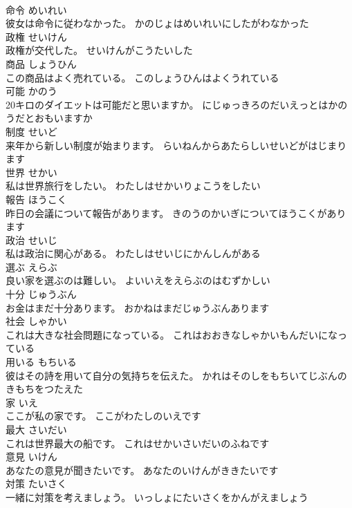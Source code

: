 \documentclass[8pt]{extreport}
\begin{document}
\begin{CJK}{UTF8}{min}
\\	命令	めいれい	
\\	彼女は命令に従わなかった。	かのじょはめいれいにしたがわなかった	
\\	政権	せいけん	
\\	政権が交代した。	せいけんがこうたいした	
\\	商品	しょうひん	
\\	この商品はよく売れている。	このしょうひんはよくうれている	
\\	可能	かのう	
\\	20キロのダイエットは可能だと思いますか。	にじゅっきろのだいえっとはかのうだとおもいますか	
\\	制度	せいど	
\\	来年から新しい制度が始まります。	らいねんからあたらしいせいどがはじまります	
\\	世界	せかい	
\\	私は世界旅行をしたい。	わたしはせかいりょこうをしたい	
\\	報告	ほうこく	
\\	昨日の会議について報告があります。	きのうのかいぎについてほうこくがあります	
\\	政治	せいじ	
\\	私は政治に関心がある。	わたしはせいじにかんしんがある	
\\	選ぶ	えらぶ	
\\	良い家を選ぶのは難しい。	よいいえをえらぶのはむずかしい	
\\	十分	じゅうぶん	
\\	お金はまだ十分あります。	おかねはまだじゅうぶんあります	
\\	社会	しゃかい	
\\	これは大きな社会問題になっている。	これはおおきなしゃかいもんだいになっている	
\\	用いる	もちいる	
\\	彼はその詩を用いて自分の気持ちを伝えた。	かれはそのしをもちいてじぶんのきもちをつたえた	
\\	家	いえ	
\\	ここが私の家です。	ここがわたしのいえです	
\\	最大	さいだい	
\\	これは世界最大の船です。	これはせかいさいだいのふねです	
\\	意見	いけん	
\\	あなたの意見が聞きたいです。	あなたのいけんがききたいです	
\\	対策	たいさく	
\\	一緒に対策を考えましょう。	いっしょにたいさくをかんがえましょう	

\end{CJK}
\end{document}
